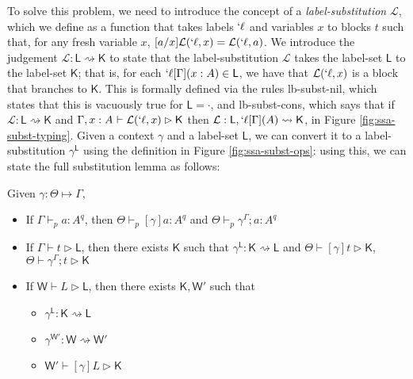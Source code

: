 \documentclass[acmsmall,screen,review]{acmart}
\newcommand{\mc}[1]{\ensuremath{\mathcal{#1}}}
\newcommand{\ms}[1]{\ensuremath{\mathsf{#1}}}
\newcommand{\lbl}[1]{{`#1}}
\newcommand{\thyp}[3]{#1: {#2}^{#3}}
\newcommand{\lhyp}[3]{#1[#2](#3)}
\newcommand{\rle}[1]{{\scriptsize\textsf{#1}}}
\newcommand{\hasty}[5]{#1 \vdash_{#2} #3: {#4}^{#5}}
\newcommand{\haslb}[3]{#1 \vdash #2 \rhd #3}
\newcommand{\lhaslb}[3]{#1 \vdash #2 \rhd #3}
\newcommand{\issubst}[3]{#1: #2 \mapsto #3}
\newcommand{\lbsubst}[3]{#1: #2 \rightsquigarrow #3}
\newcommand{\exprletsubst}[2]{{#1};{#2}}
\newcommand{\stmtletsubst}[2]{{#1};{#2}}
\newcommand{\substctx}[2]{{#1}^{#2}}
\newcommand{\substlbs}[2]{{#1}^{#2}}
\begin{document}
To solve this problem, we need to introduce the concept of a
\textit{label-substitution} \(\mc{L}\), which we define as a function that takes
labels \(\lbl{\ell}\) and variables \(x\) to blocks \(t\) such that, for any
fresh variable \(x\), \([a/x]\mc{L}(\lbl{\ell}, x) = \mc{L}(\lbl{\ell}, a)\). We
introduce the judgement \(\lbsubst{\mc{L}}{\ms{L}}{\ms{K}}\) to state that the
label-substitution \(\mc{L}\) takes the label-set \(\ms{L}\) to the label-set
\(\ms{K}\); that is, for each \(\lbl{\ell}[\Gamma](x: A) \in \ms{L}\), we have
that \(\mc{L}(\lbl{\ell}, x)\) is a block that branches to \(\ms{K}\). This is
formally defined via the rules \rle{lb-subst-nil}, which states that this is
vacuously true for \(\ms{L} = \cdot\), and \rle{lb-subst-cons}, which says that
if \(\lbsubst{\mc{L}}{\ms{L}}{\ms{K}}\) and \(\haslb{\Gamma,
\thyp{x}{A}{}}{\mc{L}(\lbl{\ell}, x)}{\ms{K}}\) then \(\lbsubst{\mc{L}}{\ms{L},
\lhyp{\lbl{\ell}}{\Gamma}{A}}{\ms{K}}\), in Figure \ref{fig:ssa-subst-typing}.
Given a context \(\gamma\) and a label-set \(\ms{L}\), we can convert it to a
label-substitution \(\substlbs{\gamma}{\ms{L}}\) using the definition in Figure
\ref{fig:ssa-subst-ops}: using this, we can state the full substitution lemma as
follows:
\begin{lemma}[Substitution] 
  Given \(\issubst{\gamma}{\Theta}{\Gamma}\),
  \begin{itemize}
    \item If \(\hasty{\Gamma}{p}{a}{A}{q}\), then
    \(\hasty{\Theta}{p}{[\gamma]a}{A}{q}\) and
    \(\hasty{\Theta}{p}{\exprletsubst{\substctx{\gamma}{\Gamma}}{a}}{A}{q}\)
    \item If \(\haslb{\Gamma}{t}{\ms{L}}\), then there exists \(\ms{K}\) such
    that \(\lbsubst{\substlbs{\gamma}{\ms{L}}}{\ms{K}}{\ms{L}}\) and
    \(\haslb{\Theta}{[\gamma]t}{\ms{K}}\),
    \(\haslb{\Theta}{\stmtletsubst{\substctx{\gamma}{\Gamma}}{t}}{\ms{K}}\)
    \item If \(\lhaslb{\ms{W}}{L}{\ms{L}}\), then there exists \(\ms{K},
    \ms{W}'\) such that 
    \begin{itemize}
      \item \(\lbsubst{\substlbs{\gamma}{\ms{L}}}{\ms{K}}{\ms{L}}\) 
      \item \(\lbsubst{\substlbs{\gamma}{\ms{W}'}}{\ms{W}}{\ms{W}'}\) 
      \item \(\lhaslb{\ms{W}'}{[\gamma]L}{\ms{K}}\)
    \end{itemize}
  \end{itemize}
\end{lemma}
\end{document}
